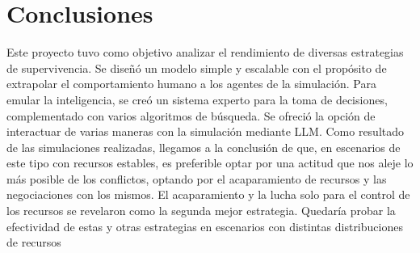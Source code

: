 \documentclass[11pt]{article}
\begin{document}
\section{Conclusiones}
Este proyecto tuvo como objetivo analizar el rendimiento de diversas estrategias de supervivencia. Se diseñó un modelo simple y escalable con el propósito de extrapolar el comportamiento humano a los agentes de la simulación. Para emular la inteligencia, se creó un sistema experto para la toma de decisiones, complementado con varios algoritmos de búsqueda.
Se ofreció la opción de interactuar de varias maneras con la simulación mediante LLM. Como resultado de las simulaciones realizadas, llegamos a la conclusión de que, en escenarios de este tipo con recursos estables, es preferible optar por una actitud que nos aleje lo más posible de los conflictos, optando por el acaparamiento de recursos y las negociaciones con los mismos.
El acaparamiento y la lucha solo para el control de los recursos se revelaron como la segunda mejor estrategia. Quedaría probar la efectividad de estas y otras estrategias en escenarios con distintas distribuciones de recursos
\end{document}
